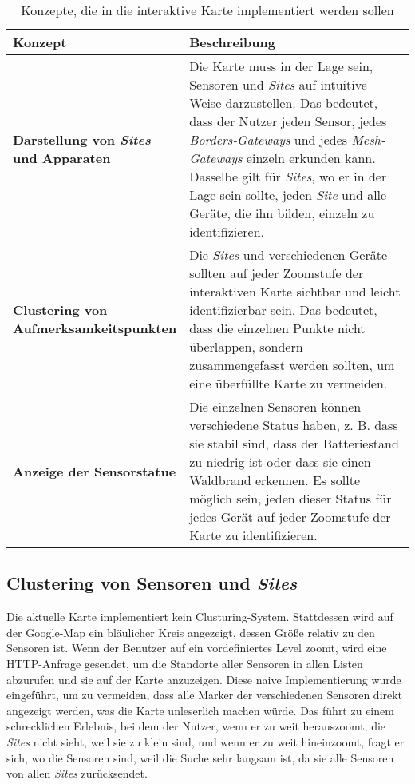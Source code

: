 \begin{table}[H]
  \begin{tabular}{p{0.3\linewidth} |p{0.7\linewidth}}
    Konzept                                               & Beschreibung                                                                                                                                                                                                                                                                                                                                                                        \\ \hline\hline

    \textbf{Darstellung von \textit{Sites} und Apparaten} & Die Karte muss in der Lage sein, Sensoren und \textit{Sites} auf intuitive Weise darzustellen. Das bedeutet, dass der Nutzer jeden Sensor, jedes \textit{Borders-Gateways} und jedes \textit{Mesh-Gateways} einzeln erkunden kann. Dasselbe gilt für \textit{Sites}, wo er in der Lage sein sollte, jeden \textit{Site} und alle Geräte, die ihn bilden, einzeln zu identifizieren. \\\hline
    \textbf{Clustering von Aufmerksamkeitspunkten}        & Die \textit{Sites} und verschiedenen Geräte sollten auf jeder Zoomstufe der interaktiven Karte sichtbar und leicht identifizierbar sein. Das bedeutet, dass die einzelnen Punkte nicht überlappen, sondern zusammengefasst werden sollten, um eine überfüllte Karte zu vermeiden.                                                                                                   \\\hline
    \textbf{Anzeige der Sensorstatue}                     & Die einzelnen Sensoren können verschiedene Status haben, z. B. dass sie stabil sind, dass der Batteriestand zu niedrig ist oder dass sie einen Waldbrand erkennen. Es sollte möglich sein, jeden dieser Status für jedes Gerät auf jeder Zoomstufe der Karte zu identifizieren.
  \end{tabular}
  \caption{Konzepte, die in die interaktive Karte implementiert werden sollen}
\end{table}

\subsection{Clustering von Sensoren und \textit{Sites}}

Die aktuelle Karte implementiert kein Clusturing-System.
Stattdessen wird auf der Google-Map ein bläulicher Kreis angezeigt, dessen Größe relativ zu den Sensoren ist.
Wenn der Benutzer auf ein vordefiniertes Level zoomt, wird eine \ac{HTTP}-Anfrage gesendet, um die Standorte aller Sensoren in allen Listen abzurufen und sie auf der Karte anzuzeigen.
Diese naive Implementierung wurde eingeführt, um zu vermeiden, dass alle Marker der verschiedenen Sensoren direkt angezeigt werden, was die Karte unleserlich machen würde.
Das führt zu einem schrecklichen Erlebnis, bei dem der Nutzer, wenn er zu weit herauszoomt, die \textit{Sites} nicht sieht, weil sie zu klein sind, und wenn er zu weit hineinzoomt, fragt er sich, wo die Sensoren sind, weil die Suche sehr langsam ist, da sie alle Sensoren von allen \textit{Sites} zurücksendet.

